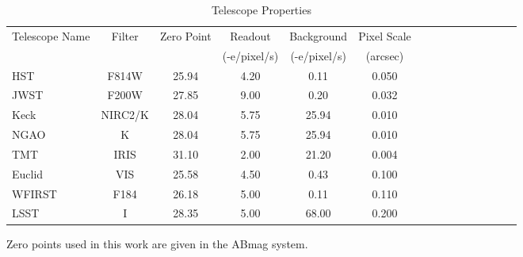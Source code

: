 \documentclass[a4paper,11pt]{article}
\begin{document}
\clearpage
\begin{table}\footnotesize
\begin{center}
\caption{Telescope Properties}
\begin{tabular}{lcccccccccccccc|}
\hline \hline
Telescope Name & Filter & Zero Point & Readout & Background & Pixel Scale \\
& & & (-e/pixel/s) & (-e/pixel/s) & (arcsec) \\
\hline
HST    &   F814W   &   25.94    &   4.20      &    0.11     &     0.050    \\
  JWST   &   F200W   &    27.85   &    9.00     &     0.20    &      0.032  \\
  Keck   &   NIRC2/K &   28.04    &   5.75     &  25.94      &  0.010      \\
  NGAO   &   K       &     28.04  &     5.75   &    25.94    &    0.010     \\
  TMT    &   IRIS    &    31.10   &      2.00   &     21.20    &      0.004  \\
  Euclid &   VIS     &    25.58   &      4.50   &     0.43    &      0.100   \\
  WFIRST &   F184    &   26.18    &     5.00    &    0.11     &     0.110   \\
  LSST   &   I      &     28.35  &       5.00  &      68.00   &        0.200  \\
\hline
\hline
\end{tabular}
\begin{tablenotes}
\item 
Zero points used in this work are given in the ABmag system. \\
\end{tablenotes}
\label{tab:telescopes parameters}
\end{center}
\end{table}
\end{document}
